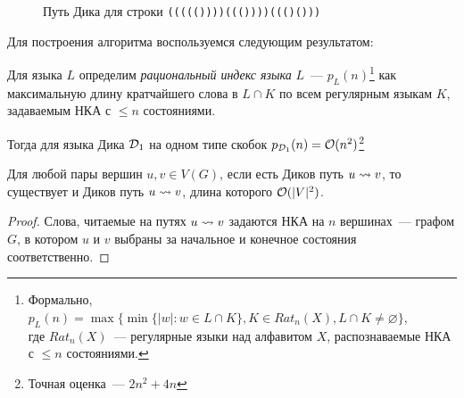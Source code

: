 \begin{figure}[h]
  \centering
  \caption{Путь Дика для строки \texttt{((((())))((())))((()()))}}
  \label{img:dyck_path}
\end{figure}

Для построения алгоритма воспользуемся следующим результатом:

\begin{lemma}\label{lm:french}

  Для языка $L$ определим \textit{рациональный индекс языка} $L$~--- $p_L(n)$\footnote{Формально, $p_L(n) = \max \{ \min \{|w| \colon w \in L \cap K \}, K \in Rat_n(X), L \cap K \ne \varnothing \}$,\\ где $Rat_n(X)$~--- регулярные языки над алфавитом $X$, распознаваемые НКА с $\le n$ состояниями.} как максимальную длину кратчайшего слова в $L \cap K$ по всем регулярным языкам $K$, задаваемым НКА с $\le n$ состояниями.

  Тогда для языка Дика $\mathcal{D}_1$ на одном типе скобок $p_{\mathcal{D}_1}(n) = \mathcal{O}(n^2)$\footnote{Точная оценка~--- $2n^2 + 4n$}
\end{lemma}

\begin{corollary}
  Для любой пары вершин $u, v \in V(G)$, если есть Диков путь $u \rightsquigarrow v$, то существует и Диков путь $u \rightsquigarrow v$, длина которого $\mathcal{O}(|V|^2)$.
\end{corollary}
\begin{proof}
  Слова, читаемые на путях $u \rightsquigarrow v$ задаются НКА на $n$ вершинах~--- графом $G$, в котором $u$ и $v$ выбраны за начальное и конечное состояния соответственно.
\end{proof}


